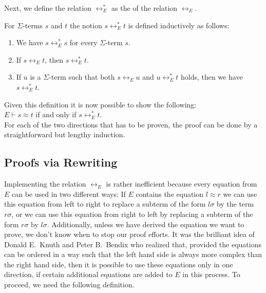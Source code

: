 Next, we define the relation $\leftrightarrow_E^*$ as the  of the relation
$\leftrightarrow_E$.
\begin{Definition}[$\leftrightarrow_E^*$]
  For $\Sigma$-terms $s$ and $t$ the notion $s \leftrightarrow_E^* t$ is defined inductively as follows:
  \begin{enumerate}
  \item We have $s \leftrightarrow_E^* s$ for every $\Sigma$-term $s$.
  \item If $s \leftrightarrow_E t$, then $s \leftrightarrow_E^* t$.
  \item If $u$ is a $\Sigma$-term such that both $s \leftrightarrow_E u$ and $u \leftrightarrow_E^* t$ holds,
        then we have $s \leftrightarrow_E^* t$. \eod
  \end{enumerate}
\end{Definition}

\noindent
Given this definition it is now possible to show the following:
\\[0.2cm]
\hspace*{1.3cm}
$E \vdash s \approx t$ \quad if and only if \quad $s \leftrightarrow_E^* t$.
\\[0.2cm]
For each of the two directions that has to be proven, the proof can be done by a straightforward but lengthy
induction. 

\subsection{Proofs via Rewriting}
Implementing the relation $\leftrightarrow_E$ is rather inefficient because every equation from $E$ can
be used in two different ways:  If $E$ contains the equation $l \approx r$ we can use this equation from left to right
to replace a subterm of the form $l\sigma$ by the term $r\sigma$, or we can use this equation from right to left by
replacing a subterm of the form $r\sigma$ by $l\sigma$.  Additionally, unless we have derived the equation we
want to prove, we don't know when to stop our proof efforts. It was the brilliant idea of Donald E.~Knuth and
Peter B.~Bendix \cite{knuth:1970} who
realized that, provided the equations can be ordered in a way such that the left hand side is always more
complex than the right hand side, then it is possible to use these equations only in one direction, if certain
additional equations are added to $E$ in this process.  To proceed, we need the following definition.

